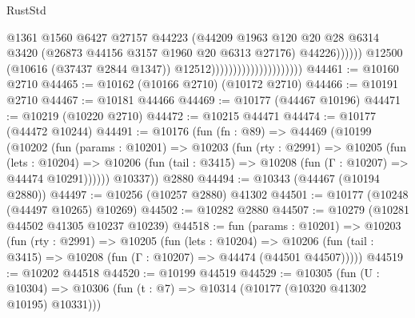 \begin{lexlean}{RustStd}
\begin{coremodule}
                                                        @1361
                                                        @1560
                                                        @6427
                                                        @27157
                                                        @44223
                                                        (@44209
                                                          @1963
                                                          @120
                                                          @20
                                                          @28
                                                          @6314
                                                          @3420
                                                          (@26873
                                                            @44156
                                                            @3157
                                                            @1960
                                                            @20
                                                            @6313
                                                            @27176)
                                                          @44226))))))
                                              @12500
                                              (@10616 (@37437 @2844 @1347))
                                              @12512)))))))))))))))))))))
@44461 := @10160 @2710
@44465 := @10162 (@10166 @2710) (@10172 @2710)
@44466 := @10191 @2710
@44467 := @10181 @44466
@44469 := @10177 (@44467 @10196)
@44471 := @10219 (@10220 @2710)
@44472 := @10215 @44471
@44474 := @10177 (@44472 @10244)
@44491 := @10176
    (fun (fn : @89) =>
    @44469
      (@10199
        (@10202
          (fun (params : @10201) =>
          @10203
            (fun (rty : @2991) =>
            @10205
              (fun (lets : @10204) =>
              @10206 (fun (tail : @3415) => @10208 (fun (Γ : @10207) => @44474 @10291))))))
        @10337))
    @2880
@44494 := @10343 (@44467 (@10194 @2880))
@44497 := @10256 (@10257 @2880) @41302
@44501 := @10177 (@10248 (@44497 @10265) @10269)
@44502 := @10282 @2880
@44507 := @10279 (@10281 @44502 @41305 @10237 @10239)
@44518 := fun (params : @10201) =>
  @10203
    (fun (rty : @2991) =>
    @10205
      (fun (lets : @10204) =>
      @10206 (fun (tail : @3415) => @10208 (fun (Γ : @10207) => @44474 (@44501 @44507)))))
@44519 := @10202 @44518
@44520 := @10199 @44519
@44529 := @10305
    (fun (U : @10304) => @10306 (fun (t : @7) => @10314 (@10177 (@10320 @41302 @10195) @10331)))

\end{coremodule}
\end{lexlean}
